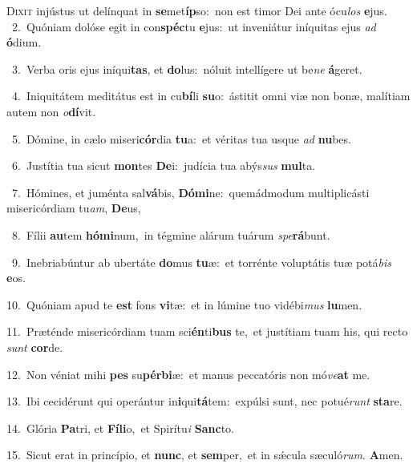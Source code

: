 \lettrine{\initial\textcolor{\initialcolor}{D}}{ixit} injústus ut delínquat in \textbf{se}\-met\-\textbf{íp}\-so:~\star non est timor Dei ante ócu\textit{los} \textbf{e}\-jus.\\
{\numbfont\textcolor{\numbcolor}{~2.}}~Quóniam dolóse egit in con\-\textbf{spéc}\-tu \textbf{e}\-jus:~\star ut inveniátur iníquitas ejus \textit{ad} \textbf{ó}\-dium.\par
{\numbfont\textcolor{\numbcolor}{~3.}}~Verba oris ejus iníqui\-\textbf{tas}\-, et \textbf{do}\-lus:~\star nóluit intellígere ut be\textit{ne} \textbf{á}\-geret.\par
{\numbfont\textcolor{\numbcolor}{~4.}}~Iniquitátem meditátus est in cu\-\textbf{bí}\-li \textbf{su}\-o:~\star ástitit omni viæ non bonæ, malítiam autem non \textit{o}\-\textbf{dí}vit.\par
{\numbfont\textcolor{\numbcolor}{~5.}}~Dómine, in cælo miseri\-\textbf{cór}\-dia \textbf{tu}\-a:~\star et véritas tua usque \textit{ad} \textbf{nu}\-bes.\par
{\numbfont\textcolor{\numbcolor}{~6.}}~Justítia tua sicut \textbf{mon}\-tes \textbf{De}\-i:~\star judícia tua abýs\textit{sus} \textbf{mul}\-ta.\par
{\numbfont\textcolor{\numbcolor}{~7.}}~Hómines, et juménta sal\-\textbf{vá}\-bis, \textbf{Dó}\-\textbf{mi}ne:~\star quemádmodum multiplicásti misericórdiam tu\-\textit{am}\-, \textbf{De}\-us,\par
{\numbfont\textcolor{\numbcolor}{~8.}}~Fílii \textbf{au}\-tem \textbf{hó}\-\textbf{mi}num,~\star in tégmine alárum tuárum \textit{spe}\-\textbf{rá}bunt.\par
{\numbfont\textcolor{\numbcolor}{~9.}}~Inebriabúntur ab ubertáte \textbf{do}\-mus \textbf{tu}\-æ:~\star et torrénte voluptátis tuæ potá\textit{bis} \textbf{e}\-os.\par
{\numbfont\textcolor{\numbcolor}{10.}}~Quóniam apud te \textbf{est} fons \textbf{vi}\-tæ:~\star et in lúmine tuo vidébi\textit{mus} \textbf{lu}\-men.\par
{\numbfont\textcolor{\numbcolor}{11.}}~Præténde misericórdiam tuam sci\-\textbf{én}\-ti\textbf{bus} te,~\star et justítiam tuam his, qui recto \textit{sunt} \textbf{cor}\-de.\par
{\numbfont\textcolor{\numbcolor}{12.}}~Non véniat mihi \textbf{pes} su\-\textbf{pér}\-\textbf{bi}æ:~\star et manus peccatóris non mó\-\textit{ve}\-\textbf{at} me.\par
{\numbfont\textcolor{\numbcolor}{13.}}~Ibi cecidérunt qui operántur in\-\textbf{i}\-qui\-\textbf{tá}\-tem:~\star expúlsi sunt, nec potué\textit{runt} \textbf{sta}\-re.\par
{\numbfont\textcolor{\numbcolor}{14.}}~Glória \textbf{Pa}\-tri, et \textbf{Fí}\-\textbf{li}o,~\star et Spirítu\textit{i} \textbf{Sanc}\-to.\par
{\numbfont\textcolor{\numbcolor}{15.}}~Sicut erat in princípio, et \textbf{nunc}\-, et \textbf{sem}\-per,~\star et in sǽcula sæculó\-\textit{rum}\-. \textbf{A}\-men.\par

